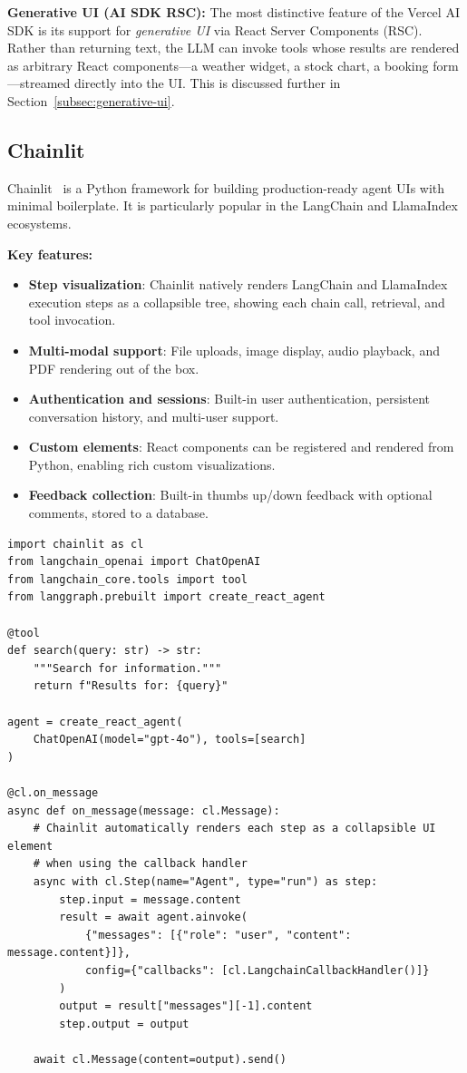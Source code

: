 \textbf{Generative UI (AI SDK RSC):} The most distinctive feature of the Vercel AI SDK is its support for \emph{generative UI} via React Server Components (RSC). Rather than returning text, the LLM can invoke tools whose results are rendered as arbitrary React components---a weather widget, a stock chart, a booking form---streamed directly into the UI. This is discussed further in Section~\ref{subsec:generative-ui}.

\subsection{Chainlit}
\label{chainlit}

Chainlit~\cite{chainlit2024} is a Python framework for building production-ready agent UIs with minimal boilerplate. It is particularly popular in the LangChain and LlamaIndex ecosystems.

\textbf{Key features:}

\begin{itemize}
  \item \textbf{Step visualization}: Chainlit natively renders LangChain and LlamaIndex execution steps as a collapsible tree, showing each chain call, retrieval, and tool invocation.
  \item \textbf{Multi-modal support}: File uploads, image display, audio playback, and PDF rendering out of the box.
  \item \textbf{Authentication and sessions}: Built-in user authentication, persistent conversation history, and multi-user support.
  \item \textbf{Custom elements}: React components can be registered and rendered from Python, enabling rich custom visualizations.
  \item \textbf{Feedback collection}: Built-in thumbs up/down feedback with optional comments, stored to a database.
\end{itemize}

\begin{lstlisting}[style=pythonstyle, caption={Minimal Chainlit agent with step visualization}]
import chainlit as cl
from langchain_openai import ChatOpenAI
from langchain_core.tools import tool
from langgraph.prebuilt import create_react_agent

@tool
def search(query: str) -> str:
    """Search for information."""
    return f"Results for: {query}"

agent = create_react_agent(
    ChatOpenAI(model="gpt-4o"), tools=[search]
)

@cl.on_message
async def on_message(message: cl.Message):
    # Chainlit automatically renders each step as a collapsible UI element
    # when using the callback handler
    async with cl.Step(name="Agent", type="run") as step:
        step.input = message.content
        result = await agent.ainvoke(
            {"messages": [{"role": "user", "content": message.content}]},
            config={"callbacks": [cl.LangchainCallbackHandler()]}
        )
        output = result["messages"][-1].content
        step.output = output

    await cl.Message(content=output).send()
\end{lstlisting}

